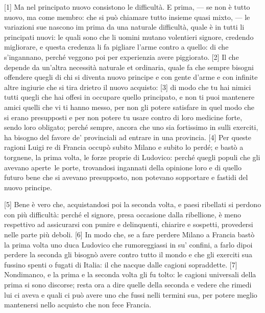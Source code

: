 
{[}1{]} Ma nel principato nuovo consistono le difficultà. E prima, --- se
non è tutto nuovo, ma come membro: che si può chiamare tutto insieme
quasi mixto, --- le variazioni sue nascono im prima da una naturale
difficultà, quale è in tutti li principati nuovi: le quali sono che li
uomini mutano volentieri signore, credendo migliorare, e questa credenza
li fa pigliare l'arme contro a quello: di che s'ingannano, perché
veggono poi per experienzia avere piggiorato. {[}2{]} Il che depende da
un'altra necessità naturale et ordinaria, quale fa che sempre bisogni
offendere quegli di chi si diventa nuovo principe e con gente d'arme e
con infinite altre ingiurie che si tira drietro il nuovo acquisto:
{[}3{]} di modo che tu hai nimici tutti quegli che hai offesi in
occupare quello principato, e non ti puoi mantenere amici quelli che vi
ti hanno messo, per non gli potere satisfare in quel modo che si erano
presupposti e per non potere tu usare contro di loro medicine forte,
sendo loro obligato; perché sempre, ancora che uno sia fortissimo in
sulli exerciti, ha bisogno del favore de' provinciali ad entrare in una
provincia. {[}4{]} Per queste ragioni Luigi  re di Francia occupò
subito Milano e subito lo perdé; e bastò a torgnene, la prima volta, le
forze proprie di Ludovico: perché quegli populi che gli avevano aperte\est\ le porte, trovandosi ingannati della opinione loro e di quello futuro
bene che si avevano presupposto, non potevano sopportare e fastidi del
nuovo principe.

{[}5{]} Bene è vero che, acquistandosi poi la seconda volta, e paesi
ribellati si perdono con più difficultà: perché el signore, presa
occasione dalla ribellione, è meno respettivo ad assicurarsi con punire
e delinquenti, chiarire e sospetti, provedersi nelle parte più deboli.
{[}6{]} In modo che, se a fare perdere Milano a Francia bastò la prima
volta uno duca Ludovico che rumoreggiassi in su' confini, a farlo dipoi
perdere la seconda gli bisognò avere contro tutto il mondo e che gli
exerciti sua fussino spenti o fugati di Italia: il che nacque dalle
cagioni sopraddette. {[}7{]} Nondimanco, e la prima e la seconda volta
gli fu tolto: le cagioni universali della prima si sono discorse; resta
ora a dire quelle della seconda e vedere che rimedi lui ci aveva e quali
ci può avere uno che fussi nelli termini sua, per potere meglio
mantenersi nello acquisto che non fece Francia.

